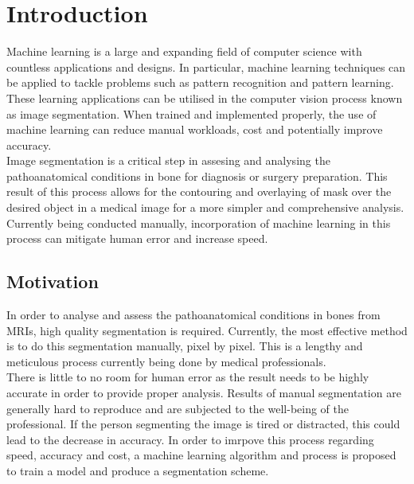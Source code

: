 \chapter{Introduction}
Machine learning is a large and expanding field of computer science with countless applications and designs. In particular, machine learning techniques can be applied to tackle problems such as pattern recognition and pattern learning. These learning applications can be utilised in the computer vision process known as image segmentation. When trained and implemented properly, the use of machine learning can reduce manual workloads, cost and potentially improve accuracy.
\\[1\baselineskip]
Image segmentation is a critical step in assesing and analysing the pathoanatomical conditions in bone for diagnosis or surgery preparation. This result of this process allows for the contouring and overlaying of mask over the desired object in a medical image for a more simpler and comprehensive analysis. Currently being conducted manually, incorporation of machine learning in this process can mitigate human error and increase speed.

\section{Motivation}
In order to analyse and assess the pathoanatomical conditions in bones from MRIs, high quality segmentation is required. Currently, the most effective method is to do this segmentation manually, pixel by pixel. This is a lengthy and meticulous process currently being done by medical professionals.
\\[1\baselineskip]
There is little to no room for human error as the result needs to be highly accurate in order to provide proper analysis. Results of manual segmentation are generally hard to reproduce and are subjected to the well-being of the professional. If the person segmenting the image is tired or distracted, this could lead to the decrease in accuracy. In order to imrpove this process regarding speed, accuracy and cost, a machine learning algorithm and process is proposed to train a model and produce a segmentation scheme.
 

